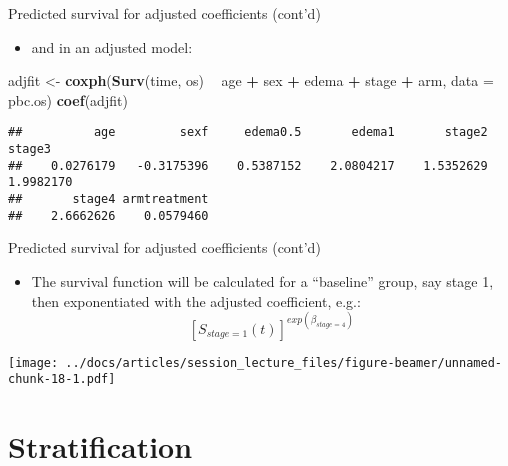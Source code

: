 \documentclass[
  ignorenonframetext,
]{beamer}
\newenvironment{Shaded}{\begin{snugshade}}{\end{snugshade}}
\newcommand{\DataTypeTok}[1]{\textcolor[rgb]{0.13,0.29,0.53}{#1}}
\newcommand{\KeywordTok}[1]{\textcolor[rgb]{0.13,0.29,0.53}{\textbf{#1}}}
\newcommand{\NormalTok}[1]{#1}
\newcommand{\OperatorTok}[1]{\textcolor[rgb]{0.81,0.36,0.00}{\textbf{#1}}}
\newcommand{\StringTok}[1]{\textcolor[rgb]{0.31,0.60,0.02}{#1}}
\providecommand{\tightlist}{%
  \setlength{\itemsep}{0pt}\setlength{\parskip}{0pt}}
\begin{document}
\begin{frame}[fragile]{Predicted survival for adjusted coefficients
(cont'd)}
\protect\hypertarget{predicted-survival-for-adjusted-coefficients-contd}{}

\begin{itemize}
\tightlist
\item
  and in an adjusted model:
\end{itemize}

\footnotesize

\begin{Shaded}
\begin{Highlighting}[]
\NormalTok{adjfit <-}\StringTok{ }\KeywordTok{coxph}\NormalTok{(}\KeywordTok{Surv}\NormalTok{(time, os) }\OperatorTok{~}\StringTok{ }\NormalTok{age }\OperatorTok{+}\StringTok{ }\NormalTok{sex }\OperatorTok{+}\StringTok{ }\NormalTok{edema}
                \OperatorTok{+}\StringTok{ }\NormalTok{stage }\OperatorTok{+}\StringTok{ }\NormalTok{arm, }\DataTypeTok{data =}\NormalTok{ pbc.os)}
\KeywordTok{coef}\NormalTok{(adjfit)}
\end{Highlighting}
\end{Shaded}

\begin{verbatim}
##          age         sexf     edema0.5       edema1       stage2       stage3 
##    0.0276179   -0.3175396    0.5387152    2.0804217    1.5352629    1.9982170 
##       stage4 armtreatment 
##    2.6662626    0.0579460
\end{verbatim}

\end{frame}

\begin{frame}{Predicted survival for adjusted coefficients (cont'd)}
\protect\hypertarget{predicted-survival-for-adjusted-coefficients-contd-1}{}

\begin{itemize}
\tightlist
\item
  The survival function will be calculated for a ``baseline'' group, say
  stage 1, then exponentiated with the adjusted coefficient, e.g.: \[
  [S_{stage=1}(t)]^{exp(\beta_{stage=4})}
  \]
\end{itemize}

\texttt{[image: ../docs/articles/session\_lecture\_files/figure-beamer/unnamed-chunk-18-1.pdf]}

\end{frame}

\hypertarget{stratification}{%
\section{Stratification}\label{stratification}}
\end{document}
